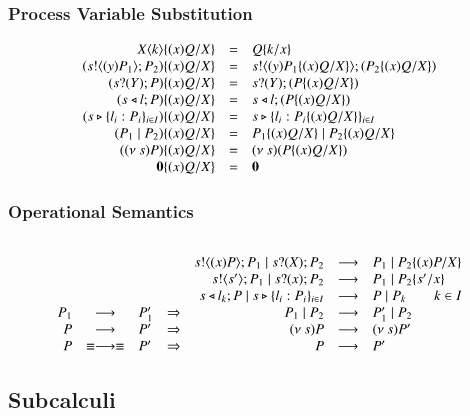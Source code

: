 \subsubsection{Process Variable Substitution}
\[
	\begin{array}{rclcrcl}
			X\langle k \rangle \{(x)Q/X \} & = & Q \{k/x \} \\
		(s ! \langle (y)P_1 \rangle ; P_2) \{(x)Q/X \} &=& s ! \langle (y)P_1 \{(x)Q/X \} \rangle ; (P_2 \{(x)Q/X \}) \\
		(s ? (Y) ; P) \{(x)Q/X \} &=& s ? (Y) ; (P \{(x)Q/X \}) \\
		(s \triangleleft l ; P) \{(x)Q/X \} &=& s \triangleleft l ; (P \{(x)Q/X \})\\
		(s \triangleright \{l_i : P_i\}_{i \in I}) \{(x)Q/X \} &=& s \triangleright \{l_i : P_i \{(x)Q/X \}\}_{i \in I}\\
		(P_1 \;|\; P_2) \{(x)Q/X \} & = & P_1 \{(x)Q/X \} \;|\; P_2 \{(x)Q/X \}\\
		((\nu\ s) P) \{(x)Q/X \} & = & (\nu\ s) (P \{(x)Q/X \})\\
		\mathbf{0} \{(x)Q/X \} & = & \mathbf{0}
	\end{array}
\]

\subsubsection{Operational Semantics}
\[
	\begin{array}{rcl}
	\end{array}
\]
\[
	\begin{array}{rclcrcl}
		&& && s ! \langle (x)P \rangle ; P_1 \;|\; s ? (X) ; P_2 &\longrightarrow& P_1 \;|\; P_2 \{(x)P/X \} \\
		&& && s ! \langle s' \rangle ; P_1 \;|\; s ? (x) ; P_2 &\longrightarrow& P_1 \;|\; P_2 \{s'/x \}\\
		&& && s \triangleleft l_k ; P \;|\; s \triangleright \{l_i : P_i\}_{i \in I} &\longrightarrow& P \;|\; P_k \qquad k \in I \\
		P_1 &\longrightarrow& P_1' &\Rightarrow& P_1 \;|\; P_2 &\longrightarrow& P_1' \;|\; P_2\\
		P &\longrightarrow& P' &\Rightarrow& (\nu\ s) P &\longrightarrow& (\nu\ s) P'\\
		P &\equiv \longrightarrow \equiv& P'&\Rightarrow& P &\longrightarrow& P' 		
	\end{array}
\]

\subsection{Subcalculi}

